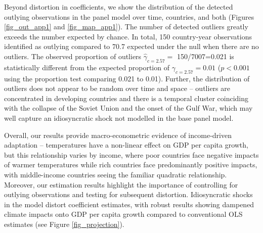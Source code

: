\documentclass[11pt, letterpaper]{article}
\numberwithin{algorithm}{section}
\numberwithin{assumption}{section}
\numberwithin{lemma}{section}
\numberwithin{theorem}{section}
\numberwithin{corollary}{section}
\numberwithin{remark}{section}
\numberwithin{equation}{section}
\numberwithin{figure}{section}
\numberwithin{table}{section}
\newcommand{\ignore}[1]{}
\begin{document}
Beyond distortion in coefficients, we show the distribution of the detected outlying observations in the panel model over time, countries, and both (Figures \ref{fig_out_app1} and \ref{fig_map_app1}). The number of detected outliers greatly exceeds the number expected by chance. In total, 150 country-year observations identified as outlying compared to 70.7 expected under the null when there are no outliers. The observed proportion of outliers $\hat{\gamma}_{c=2.57}=$ 150/7007=0.021 is statistically different from the expected proportion of $\gamma_{c=2.57}=0.01$ ($p<0.001$ using the \citet{jiao2020testingoutlier}\ignore{Check this reference} proportion test comparing 0.021 to 0.01). Further, the distribution of outliers does not appear to be random over time and space -- outliers are concentrated in developing countries and there is a temporal cluster coinciding with the collapse of the Soviet Union and the onset of the Gulf War, which may well capture an idiosyncratic shock not modelled in the base panel model.

Overall, our results provide macro-econometric evidence of income-driven adaptation -- temperatures have a non-linear effect on GDP per capita growth, but this relationship varies by income, where poor countries face negative impacts of warmer temperatures while rich countries face predominantly positive impacts, with middle-income countries seeing the familiar quadratic relationship. Moreover, our estimation results highlight the importance of controlling for outlying observations and testing for subsequent distortion. Idiosyncratic shocks in the model distort coefficient estimates, with robust results showing dampened climate impacts onto GDP per capita growth compared to conventional OLS estimates (see Figure \ref{fig_projection}).

\ignore{CHECK}
\ignore{Note: Can we show that our residuals produced by IIS are iid normal or at least satisfy either normal, homoscedasticity, or serially independent? Any one of these will help us to defend our paper if referees criticise on our assumptions. In addition, in this case we have a very well specified climate impact model that can pass all the specification tests.}


\ignore{I have a comment in my notes that reads: Bottom line for the test statistic, only do this for temp, temp_2 and all. Question: does that mean I should exclude the test stat for all other lines? and the ones that we keep, do we do it on the individual coef or both/all?}
\end{document}
